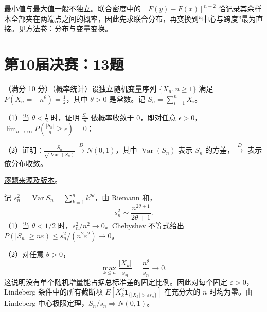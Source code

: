 \begin{remark}[方法与条件]

最小值与最大值一般不独立。联合密度中的 $[F(y)-F(x)]^{n-2}$ 恰记录其余样本全部夹在两端点之间的概率，因此先求联合分布，再变换到“中心与跨度”最为直接。见\hyperref[app:probability-law]{方法卷：分布与变量变换}。

\end{remark}

\section{第10届决赛：13题}\label{pr:fin10-hi:13}

\begin{example}[公开题解转录]\label{q:fin10-hi:13}

（满分 10 分）（概率统计）设独立随机变量序列 $\{X_n,n\geq1\}$ 满足 $P(X_n=\pm n^{\theta})=\frac{1}{2}$，其中 $\theta>0$ 是常数。记 $S_n=\sum_{i=1}^{n}X_i$。

（1）当 $\theta<\frac{1}{2}$ 时，证明 $\frac{S_n}{n}$ 依概率收敛于 $0$，即对任意 $\epsilon>0$，$\lim_{n\to\infty}P\left(\frac{\left|S_n\right|}{n}\geq\epsilon\right)=0$；

（2）证明：$\frac{S_n}{\sqrt{\operatorname{Var}\left(S_n\right)}}\xrightarrow{D}N(0,1)$，其中 $\operatorname{Var}\left(S_n\right)$ 表示 $S_n$ 的方差，$\xrightarrow{D}$ 表示依分布收敛。

\end{example}

\href{https://github.com/lzxcr/cmc-mathematics/blob/64916fa1fdbc3e444a652eca204d5669058ee321/src/problems/finals/10/15.md}{逐题来源及版本}。

\begin{solve}

记 $s_n^2=\operatorname{Var}S_n=\sum_{k=1}^nk^{2\theta}$，由 Riemann 和，
\[
s_n^2\sim\frac{n^{2\theta+1}}{2\theta+1}.
\]
（1）当 $\theta<1/2$ 时，$s_n^2/n^2\to0$。Chebyshev 不等式给出 $P(|S_n|\geq n\varepsilon)\leq s_n^2/(n^2\varepsilon^2)\to0$。

（2）对任意 $\theta>0$，
\[
\max_{k\leq n}\frac{|X_k|}{s_n}=\frac{n^\theta}{s_n}\longrightarrow0.
\]
这说明没有单个随机增量能占据总标准差的固定比例。因此对每个固定 $\varepsilon>0$，Lindeberg 条件中的所有截断项 $E[X_k^2\mathbf1_{\{|X_k|>\varepsilon s_n\}}]$ 在充分大的 $n$ 时均为零。由 Lindeberg 中心极限定理，$S_n/s_n\Rightarrow N(0,1)$。

\end{solve}

